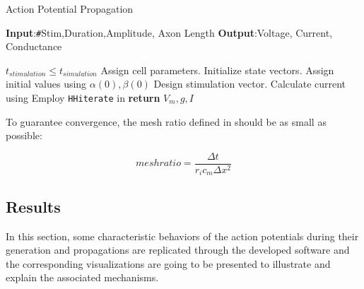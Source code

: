\documentclass{IEEEtran}
\begin{document}
\begin{algorithm}[h]
    \caption{Action Potential Propagation}\label{alg:approp}
    \hspace*{\algorithmicindent}\textbf{Input}:\texttt{\#}Stim,Duration,Amplitude, Axon Length\newline
    \hspace*{\algorithmicindent}\textbf{Output}:Voltage, Current, Conductance
    \begin{algorithmic}[1]
    
    \Ensure $t_{stimulation} \le t_{simulation}$
    \State Assign cell parameters. 
    \State Initialize state vectors. 
    \State Assign initial values using $\alpha(0),\beta(0)$ 
    \State Design stimulation vector. 
        \State Calculate current using 
        \State Employ \texttt{HHiterate} in 
    \EndFor
    \EndFor
    \State \textbf{return} $V_m, g, I$
    \end{algorithmic}
\end{algorithm}

To guarantee convergence, the mesh ratio defined in  should be as small as possible:

\begin{equation}
    mesh ratio = \frac{\Delta t}{r_i c_m \Delta x^2} \label{eqn:mesh}
\end{equation}

\subsection{Results}

In this section, some characteristic behaviors of the action potentials during their generation and propagations are replicated through the developed software and the corresponding visualizations are going to be presented to illustrate and explain the associated mechanisms.
\end{document}
